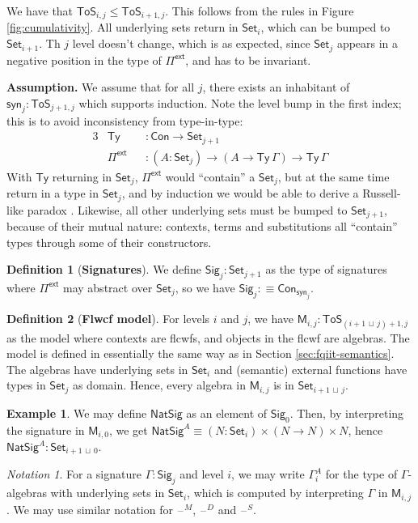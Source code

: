 \documentclass[12pt,a4paper,twoside,openany]{book}
\theoremstyle{remark}
\newtheorem{notation}{Notation}
\theoremstyle{definition}
\newtheorem{mydefinition}{Definition}
\newtheorem{myexample}{Example}
\theoremstyle{theorem}
\newcommand{\ms}[1]{\mathsf{#1}}
\newcommand{\bs}[1]{\boldsymbol{#1}}
\newcommand{\Con}{\mathsf{Con}}
\newcommand{\Ty}{\mathsf{Ty}}
\newcommand{\blank}{\mathord{\hspace{1pt}\text{--}\hspace{1pt}}}
\newcommand{\Set}{\mathsf{Set}}
\newcommand{\ToS}{\mathsf{ToS}}
\newcommand{\Pie}{\Pi^{\mathsf{ext}}}
\newcommand{\Sig}{\mathsf{Sig}}
\newcommand{\syn}{\mathsf{syn}}
\newcommand{\bM}{\bs{\mathsf{M}}}
\newcommand{\defn}{:\equiv}
\newcommand{\lub}{\,\sqcup\,}
\begin{document}
We have that $\ToS_{i,j} \leq \ToS_{i+1,j}$. This follows from the rules
in Figure \ref{fig:cumulativity}. All underlying sets return in $\Set_i$, which
can be bumped to $\Set_{i + 1}$.  Th $j$ level doesn't change, which is as
expected, since $\Set_j$ appears in a negative position in the type of $\Pie$,
and has to be invariant.

\textbf{Assumption.} We assume that for all $j$, there exists an inhabitant of
$\syn_j : \ToS_{j+1,j}$ which supports induction. Note the level bump in the first index;
this is to avoid inconsistency from type-in-type:
\begin{alignat*}{3}
  &\Ty &&: \Con \to \Set_{j+1}\\ &\Pie &&: (A : \Set_j) \to (A \to \Ty\,\Gamma)
  \to \Ty\,\Gamma
\end{alignat*}
With $\Ty$ returning in $\Set_j$, $\Pie$ would ``contain'' a $\Set_j$, but at
the same time return in a type in $\Set_j$, and by induction we would be able to
derive a Russell-like paradox \cite{TODO}. Likewise, all other underlying sets
must be bumped to $\Set_{j+1}$, because of their mutual nature: contexts, terms
and substitutions all ``contain'' types through some of their constructors.

\begin{mydefinition}[\textbf{Signatures}]
We define $\Sig_j : \Set_{j+1}$ as the type of signatures where $\Pie$ may
abstract over $\Set_j$, so we have $\Sig_j \defn \Con_{\syn_j}$.
\end{mydefinition}

\begin{mydefinition}[\textbf{Flwcf model}]
For levels $i$ and $j$, we have $\bM_{i,j} : \ToS_{(i+1\lub j)+1,j}$ as the
model where contexts are flcwfs, and objects in the flcwf are algebras.  The
model is defined in essentially the same way as in Section
\ref{sec:fqiit-semantics}. The algebras have underlying sets in $\Set_i$ and
(semantic) external functions have types in $\Set_j$ as domain. Hence, every
algebra in $\bM_{i,j}$ is in $\Set_{i+1\lub j}$.
\end{mydefinition}

\begin{myexample}
We may define $\ms{NatSig}$ as an element of $\Sig_0$. Then, by interpreting the
signature in $\bM_{i,0}$, we get $\ms{NatSig}^A \equiv (N : \Set_i) \times (N
\to N) \times N$, hence $\ms{NatSig}^A : \Set_{i + 1 \lub 0}$.
\end{myexample}

\begin{notation}
For a signature $\Gamma : \Sig_j$ and level $i$, we may write $\Gamma^A_i$ for
the type of $\Gamma$-algebras with underlying sets in $\Set_i$, which is
computed by interpreting $\Gamma$ in $\bM_{i,j}$. We may use similar notation
for $\blank^M$, $\blank^D$ and $\blank^S$.
\end{notation}
\end{document}
